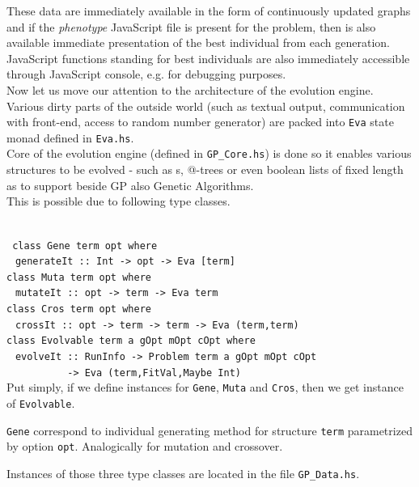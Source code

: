 \documentclass[12pt,a4paper]{report}
\makeatletter
\newcommand{\lets}{let us\xspace}
\newcommand{\atTree}{@-tree\xspace}
\makeatother
\begin{document}
These data are immediately available in the form of
continuously updated graphs and if 
the \textit{phenotype} JavaScript file is present 
for the problem, then is also available immediate 
presentation of the best individual from each generation.
JavaScript functions standing for best individuals are 
also immediately accessible through JavaScript console,
e.g. for debugging purposes.\\  
  
Now \lets move our attention to the architecture of the evolution engine.
Various dirty parts of the outside world (such as textual output,
communication with front-end, access to random number generator) are  
packed into \texttt{Eva} state monad defined in \texttt{Eva.hs}.\\
  
Core of the evolution engine (defined in \texttt{GP\_{}Core.hs})
is done so it enables various structures
to be evolved - such as \sexprTree{}s, \atTree{}s or even boolean lists
of fixed length as to support beside GP also Genetic Algorithms.\\[1em]

This is possible due to following type classes. 
 
~\\\texttt{
class Gene term opt where\\
$~\;\;$generateIt :: Int -> opt -> Eva [term]\\[1em]
class Muta term opt where\\
$~\;\;$mutateIt :: opt -> term -> Eva term \\[1em]
class Cros term opt where\\
$~\;\;$crossIt :: opt -> term -> term -> Eva (term,term) \\[1em]
class Evolvable term a gOpt mOpt cOpt where\\
$~\;\;$evolveIt :: RunInfo -> Problem term a gOpt mOpt cOpt  \\
$~~~~~~~~~~~~~~~~~~~~~~$
-> Eva (term,FitVal,Maybe Int)
} ~\\


Put simply, if we define instances for 
\texttt{Gene}, \texttt{Muta} and \texttt{Cros}, then we get
instance of \texttt{Evolvable}. 

\texttt{Gene} correspond to individual generating method for
structure \texttt{term} parametrized by option \texttt{opt}.
Analogically for mutation and crossover.

Instances of those three type classes are located in the file
\texttt{GP\_{}Data.hs}.
\end{document}
